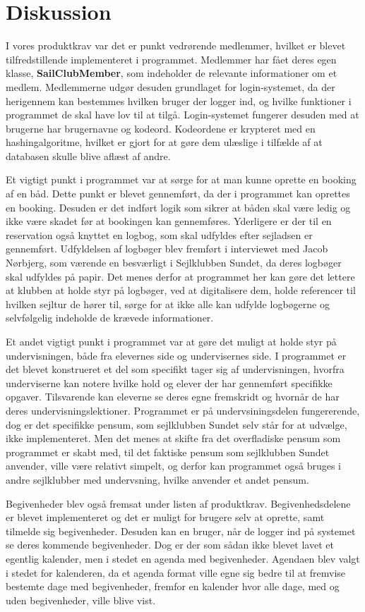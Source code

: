\chapter{Diskussion}
I vores produktkrav var det er punkt vedrørende medlemmer, hvilket er blevet tilfredstillende implementeret i programmet. 
Medlemmer har fået deres egen klasse, \textbf{SailClubMember}, som indeholder de relevante informationer om et medlem. 
Medlemmerne udgør desuden grundlaget for login-systemet, da der herigennem kan bestemmes hvilken bruger der logger ind, og hvilke funktioner i programmet de skal have lov til at tilgå. 
Login-systemet fungerer desuden med at brugerne har brugernavne og kodeord. 
Kodeordene er krypteret med en hashingalgoritme, hvilket er gjort for at gøre dem ulæslige i tilfælde af at databasen skulle blive aflæst af andre. 

Et vigtigt punkt i programmet var at sørge for at man kunne oprette en booking af en båd. 
Dette punkt er blevet gennemført, da der i programmet kan oprettes en booking. 
Desuden er det indført logik som sikrer at båden skal være ledig og ikke være skadet før at bookingen kan gennemføres. 
Yderligere er der til en reservation også knyttet en logbog, som skal udfyldes efter sejladsen er gennemført. 
Udfyldelsen af logbøger blev fremført i interviewet med Jacob Nørbjerg, som værende en besværligt i Sejlklubben Sundet, da deres logbøger skal udfyldes på papir. 
Det menes derfor at programmet her kan gøre det lettere at klubben at holde styr på logbøger, ved at digitalisere dem, holde referencer til hvilken sejltur de hører til, sørge for at ikke alle kan udfylde logbøgerne og selvfølgelig indeholde de krævede informationer. 

Et andet vigtigt punkt i programmet var at gøre det muligt at holde styr på undervisningen, både fra elevernes side og undervisernes side. 
I programmet er det blevet konstrueret et del som specifikt tager sig af undervisningen, hvorfra underviserne kan notere hvilke hold og elever der har gennemført specifikke opgaver.
Tilsvarende kan eleverne se deres egne fremskridt og hvornår de har deres undervisningslektioner.
Programmet er på undervsiningsdelen fungererende, dog er det specifikke pensum, som sejlklubben Sundet selv står for at udvælge, ikke implementeret. 
Men det menes at skifte fra det overfladiske pensum som programmet er skabt med, til det faktiske pensum som sejlklubben Sundet anvender, ville være relativt simpelt, og derfor kan programmet også bruges i andre sejlklubber med undervsning, hvilke anvender et andet pensum.

Begivenheder blev også fremsat under listen af produktkrav.
Begivenhedsdelene er blevet implementeret og det er muligt for brugere selv at oprette, samt tilmelde sig begivenheder.
Desuden kan en bruger, når de logger ind på systemet se deres kommende begivenheder.
Dog er der som sådan ikke blevet lavet et egentlig kalender, men i stedet en agenda med begivenheder.
Agendaen blev valgt i stedet for kalenderen, da et agenda format ville egne sig bedre til at fremvise bestemte dage med begivenheder, fremfor en kalender hvor alle dage, med og uden begivenheder, ville blive vist.
